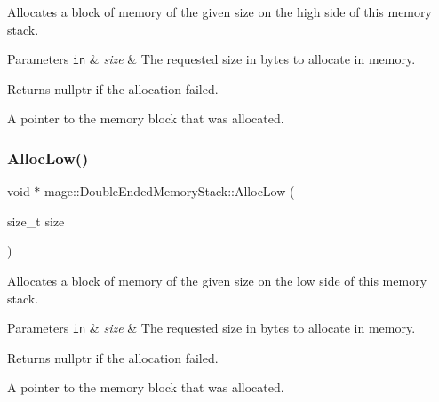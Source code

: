 Allocates a block of memory of the given size on the high side of this memory stack.


\begin{DoxyParams}[1]{Parameters}
\mbox{\tt in}  & {\em size} & The requested size in bytes to allocate in memory. \\
\hline
\end{DoxyParams}
\begin{DoxyReturn}{Returns}
{\ttfamily nullptr} if the allocation failed. 

A pointer to the memory block that was allocated. 
\end{DoxyReturn}
\mbox{\label{classmage_1_1_double_ended_memory_stack_a4eece9ca8748f77783e8235c6192b260}} 
\subsubsection{\texorpdfstring{Alloc\+Low()}{AllocLow()}}
{\footnotesize\ttfamily void $\ast$ mage\+::\+Double\+Ended\+Memory\+Stack\+::\+Alloc\+Low (\begin{DoxyParamCaption}\item[{size\+\_\+t}]{size }\end{DoxyParamCaption})\hspace{0.3cm}{\ttfamily [noexcept]}}

Allocates a block of memory of the given size on the low side of this memory stack.


\begin{DoxyParams}[1]{Parameters}
\mbox{\tt in}  & {\em size} & The requested size in bytes to allocate in memory. \\
\hline
\end{DoxyParams}
\begin{DoxyReturn}{Returns}
{\ttfamily nullptr} if the allocation failed. 

A pointer to the memory block that was allocated. 
\end{DoxyReturn}
\mbox{\label{classmage_1_1_double_ended_memory_stack_a6f2d4036e67cca2836293ad421ddfdfd}} 
